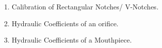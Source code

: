\documentclass[12pt, a4paper]{article}
\begin{document}
\begin{enumerate}[label=\arabic*.]
                                                                                                                                                                                                                                                                                                                                                                                                                                                                                                                                                                                                                                                                                                                                                                                                    \item Calibration of Rectangular Notches/ V-Notches.
                                                                                                                                                                                                                                                                                                                                                                                                                                                                                                                                                                                                                                                                                                                                                                                                        \item Hydraulic Coefficients of an orifice.
                                                                                                                                                                                                                                                                                                                                                                                                                                                                                                                                                                                                                                                                                                                                                                                                            \item Hydraulic Coefficients of a Mouthpiece.

\end{enumerate}
\end{document}
